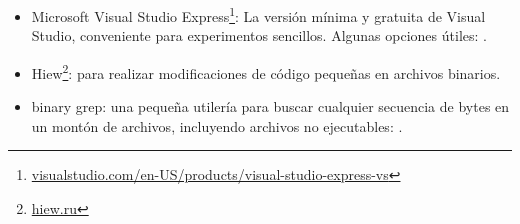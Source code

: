 \begin{itemize}
\item
Microsoft Visual Studio Express\footnote{\href{http://www.microsoft.com/express/Downloads/}{visualstudio.com/en-US/products/visual-studio-express-vs}}:
La versi\'on m\'inima y gratuita de Visual Studio, conveniente para experimentos sencillos.
Algunas opciones \'utiles: .

\item
\label{Hiew}
Hiew\footnote{\href{http://www.hiew.ru/}{hiew.ru}}:
para realizar modificaciones de c\'odigo peque\~nas en archivos binarios.
	
\item
{}
binary grep: 
una peque\~na utiler\'ia para buscar cualquier secuencia de bytes en un mont\'on de archivos, 
incluyendo archivos no ejecutables: \BGREPURL.
\end{itemize}


